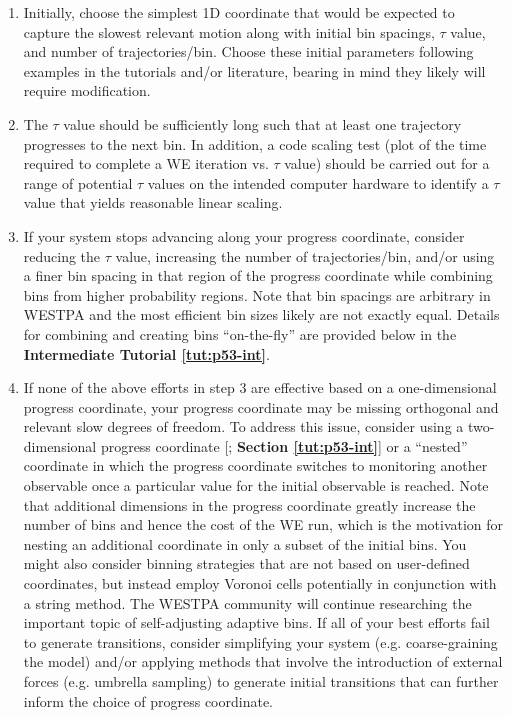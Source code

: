 \begin{enumerate}
\item Initially, choose the simplest 1D coordinate that would be expected to capture the slowest relevant motion along with initial bin spacings, $\tau$ value, and number of trajectories/bin. 
Choose these initial parameters following examples in the tutorials and/or literature, bearing in mind they likely will require modification.
\item The $\tau$ value should be sufficiently long such that at least one trajectory progresses to the next bin. 
In addition, a code scaling test (plot of the time required to complete a WE iteration vs. $\tau$ value) should be carried out for a range of potential $\tau$ values on the intended computer hardware to identify a $\tau$ value that yields reasonable linear scaling. 
\item If your system stops advancing along your progress coordinate, consider reducing the $\tau$ value, increasing the number of trajectories/bin, and/or using a finer bin spacing in that region of the progress coordinate while combining bins from higher probability regions. 
Note that bin spacings are arbitrary in WESTPA and the most efficient bin sizes likely are not exactly equal. 
Details for combining and creating bins “on-the-fly” are provided below in the \textbf{Intermediate Tutorial \ref{tut:p53-int}}. 
\item If none of the above efforts in step 3 are effective based on a one-dimensional progress coordinate, your progress coordinate may be missing orthogonal and relevant slow degrees of freedom. 
To address this issue, consider using a two-dimensional progress coordinate [\citep{Saglam2019,Zwier2016}; \textbf{Section \ref{tut:p53-int}}] or a “nested” coordinate in which the progress coordinate switches to monitoring another observable once a particular value for the initial observable is reached. 
Note that additional dimensions in the progress coordinate greatly increase the number of bins and hence the cost of the WE run, which is the motivation for nesting an additional coordinate in only a subset of the initial bins. 
You might also consider binning strategies that are not based on user-defined coordinates, but instead employ Voronoi cells potentially in conjunction with a string method. 
The WESTPA community will continue researching the important topic of self-adjusting adaptive bins. 
If all of your best efforts fail to generate transitions, consider simplifying your system (e.g. coarse-graining the model) and/or applying methods that involve the introduction of external forces (e.g. umbrella sampling) to generate initial transitions that can further inform the choice of progress coordinate.
\end{enumerate}

